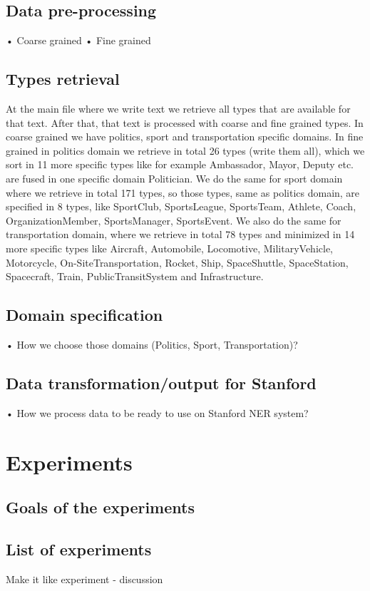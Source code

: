 \documentclass[thesis=M,english]{FITthesis}[2012/10/20]
\begin{document}
\section{Data pre-processing}
•	Coarse grained
•	Fine grained 

\section{Types retrieval}\label{}
At the main file where we write text we retrieve all types that are available for that text. After that, that text is processed with coarse and fine grained types. In coarse grained we have politics, sport and transportation specific domains. In fine grained in politics domain we retrieve in total 26 types (write them all), which we sort in 11 more specific types like for example Ambassador, Mayor, Deputy etc. are fused in one specific domain Politician. We do the same for sport domain where we retrieve in total 171 types, so those types, same as politics domain, are specified in 8 types, like SportClub, SportsLeague, SportsTeam, Athlete, Coach, OrganizationMember, SportsManager, SportsEvent. We also do the same for transportation domain, where we retrieve in total 78 types and minimized in 14 more specific types like Aircraft, Automobile, Locomotive, MilitaryVehicle, Motorcycle, On-SiteTransportation, Rocket, Ship, SpaceShuttle, SpaceStation, Spacecraft, Train, PublicTransitSystem and Infrastructure.  

\section{Domain specification}
•	How we choose those domains (Politics, Sport, Transportation)?

\section{Data transformation/output for Stanford}
•	How we process data to be ready to use on Stanford NER system?


\chapter{Experiments}

\section{Goals of the experiments}

\section{List of experiments}
Make it like experiment - discussion
\end{document}
